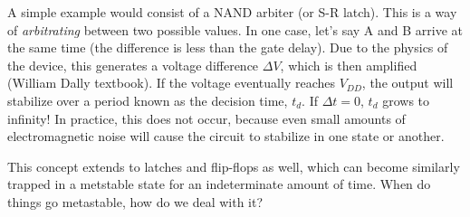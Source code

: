 \documentclass{article}
\begin{document}
A simple example would consist of a NAND arbiter (or S-R latch). This is a way of \textit{arbitrating} between two possible values. In one case, let's say A and B arrive at the same time (the difference is less than the gate delay). Due to the physics of the device, this generates a voltage difference \(\Delta V\), which is then amplified (William Dally textbook). If the voltage eventually reaches \(V_{DD}\), the output will stabilize over a period known as the decision time, \(t_d\). If \(\Delta t = 0\), \(t_d\) grows to infinity! In practice, this does not occur, because even small amounts of electromagnetic noise will cause the circuit to stabilize in one state or another.

This concept extends to latches and flip-flops as well, which can become similarly trapped in a metstable state for an indeterminate amount of time. When do things go metastable, how do we deal with it?
\end{document}
